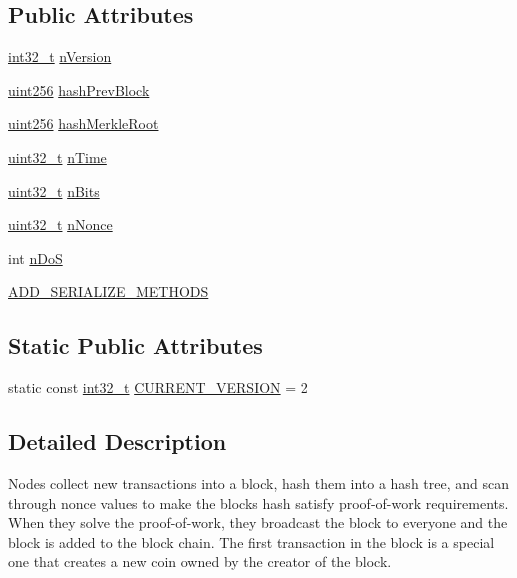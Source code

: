 \subsection*{Public Attributes}
\begin{DoxyCompactItemize}
\item 
\hyperlink{stdint_8h_ab1967d8591af1a4e48c37fd2b0f184d0}{int32\+\_\+t} \hyperlink{class_c_block_header_ad64b7a76914741861f55f0f38ed66fb5}{n\+Version}
\item 
\hyperlink{classuint256}{uint256} \hyperlink{class_c_block_header_ad9b904df502d648309342e5e5b0949a6}{hash\+Prev\+Block}
\item 
\hyperlink{classuint256}{uint256} \hyperlink{class_c_block_header_ae9ef013abbcfbd9f8bc23dbcda0fd5af}{hash\+Merkle\+Root}
\item 
\hyperlink{stdint_8h_a435d1572bf3f880d55459d9805097f62}{uint32\+\_\+t} \hyperlink{class_c_block_header_aa435a58a8f13a304681e797366e0d56d}{n\+Time}
\item 
\hyperlink{stdint_8h_a435d1572bf3f880d55459d9805097f62}{uint32\+\_\+t} \hyperlink{class_c_block_header_a88d501b1da4d34d7dc80c65bd4837670}{n\+Bits}
\item 
\hyperlink{stdint_8h_a435d1572bf3f880d55459d9805097f62}{uint32\+\_\+t} \hyperlink{class_c_block_header_a3826d43cd36673027e17ecc674450e71}{n\+Nonce}
\item 
int \hyperlink{class_c_block_header_af07deb221708fa7a992e65ec20d13534}{n\+Do\+S}
\item 
\hyperlink{class_c_block_header_abddc9307695fbe6bd9bb1a7f48d38011}{A\+D\+D\+\_\+\+S\+E\+R\+I\+A\+L\+I\+Z\+E\+\_\+\+M\+E\+T\+H\+O\+D\+S}
\end{DoxyCompactItemize}
\subsection*{Static Public Attributes}
\begin{DoxyCompactItemize}
\item 
static const \hyperlink{stdint_8h_ab1967d8591af1a4e48c37fd2b0f184d0}{int32\+\_\+t} \hyperlink{class_c_block_header_a1da5740e22d124df509383a1ff96eb7c}{C\+U\+R\+R\+E\+N\+T\+\_\+\+V\+E\+R\+S\+I\+O\+N} = 2
\end{DoxyCompactItemize}


\subsection{Detailed Description}
Nodes collect new transactions into a block, hash them into a hash tree, and scan through nonce values to make the block\textquotesingle{}s hash satisfy proof-\/of-\/work requirements. When they solve the proof-\/of-\/work, they broadcast the block to everyone and the block is added to the block chain. The first transaction in the block is a special one that creates a new coin owned by the creator of the block.

